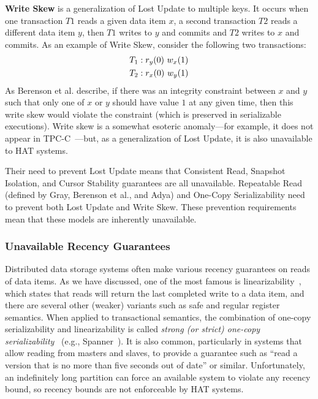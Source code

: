 \textbf{Write Skew} is a generalization of Lost Update to multiple
keys. It occurs when one transaction $T1$ reads a given data item $x$,
a second transaction $T2$ reads a different data item $y$, then $T1$
writes to $y$ and commits and $T2$ writes to $x$ and commits. As an
example of Write Skew, consider the following two transactions:
\begin{align*}
\small
T_1 &: r_y(0)~w_x(1)
\\T_2 &: r_x(0)~w_y(1)
\end{align*}
As Berenson et al. describe, if there was an integrity constraint
between $x$ and $y$ such that only one of $x$ or $y$ should have value
$1$ at any given time, then this write skew would violate the constraint (which is preserved in serializable executions). Write skew is a somewhat
esoteric anomaly---for example, it does not appear in
TPC-C~\cite{snapshot-serializable}---but, as a generalization of Lost
Update, it is also unavailable to HAT systems.

Their need to prevent Lost Update means that Consistent Read, Snapshot
Isolation, and Cursor Stability guarantees are all unavailable.
Repeatable Read (defined by Gray, Berenson et al., and Adya) and
One-Copy Serializability need to prevent both Lost Update and Write
Skew. These prevention requirements mean that these models are
inherently unavailable.

\subsubsection{Unavailable Recency Guarantees}

Distributed data storage systems often make various recency guarantees
on reads of data items. As we have discussed, one of the most famous
is linearizability~\cite{herlihy-art}, which states that reads will
return the last completed write to a data item, and there are several
other (weaker) variants such as safe and regular register
semantics. When applied to transactional semantics, the combination of
one-copy serializability and linearizability is called \textit{strong
  (or strict) one-copy serializability}~\cite{adya} (e.g.,
Spanner~\cite{spanner}). It is also common, particularly in systems
that allow reading from masters and slaves, to provide a guarantee
such as ``read a version that is no more than five seconds out of
date'' or similar. Unfortunately, an indefinitely long partition can
force an available system to violate any recency bound, so recency
bounds are not enforceable by HAT systems.

